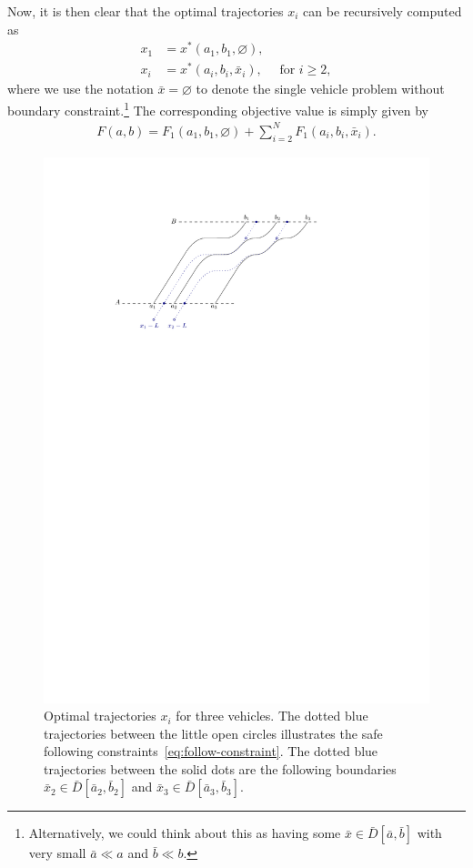 \documentclass[a4paper]{article}
\theoremstyle{definition}
\theoremstyle{plain}
\begin{document}
%
Now, it is then clear that the optimal trajectories $x_{i}$ can be
recursively computed as
\begin{subequations}
\begin{align}
  x_{1} &= x^{*}(a_{1}, b_{1}, \varnothing) , \\
  x_{i} &= x^{*}(a_{i}, b_{i}, \bar{x}_{i})  ,  \quad \text{ for } i \geq 2 ,
\end{align}
\end{subequations}
%
where we use the notation $\bar{x} = \varnothing$ to denote the single vehicle problem
without boundary constraint.\footnote{Alternatively, we could think about this as having
some $\bar{x} \in \bar{D}[\bar{a},\bar{b}]$ with very small $\bar{a} \ll a$ and
$\bar{b} \ll b$.}
%
The corresponding objective value is simply given by
\begin{align}
  F(a, b) = F_{1}(a_{1}, b_{1}, \varnothing) + \sum_{i=2}^{N} F_{1}(a_{i}, b_{i}, \bar{x}_{i}) .
\end{align}

\begin{figure}
  \centering
  \includegraphics[scale=1.0]{figures/motion/rough/solution}
  \caption{Optimal trajectories $x_{i}$ for three vehicles. The dotted blue
    trajectories between the little open circles illustrates the safe following
    constraints~\eqref{eq:follow-constraint}. The dotted blue trajectories between
    the solid dots are the following boundaries
    $\bar{x}_{2} \in \bar{D}[\bar{a}_{2}, \bar{b}_{2}]$ and
    $\bar{x}_{3} \in \bar{D}[\bar{a}_{3}, \bar{b}_{3}]$.}%
  \label{fig:solution}
\end{figure}
\end{document}
